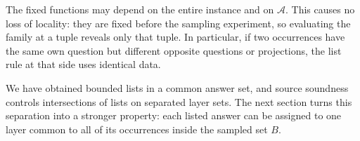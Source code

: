 The fixed functions may depend on the entire instance and on
$\mathcal A$. This causes no loss of locality: they are fixed before
the sampling experiment, so evaluating the family at a tuple reveals
only that tuple. In particular, if two occurrences have the same own
question but different opposite questions or projections, the list
rule at that side uses identical data.

We have obtained bounded lists in a common answer set, and source
soundness controls intersections of lists on separated layer sets.
The next section turns this separation into a stronger property:
each listed answer can be assigned to one layer common to all of its
occurrences inside the sampled set $B$.

